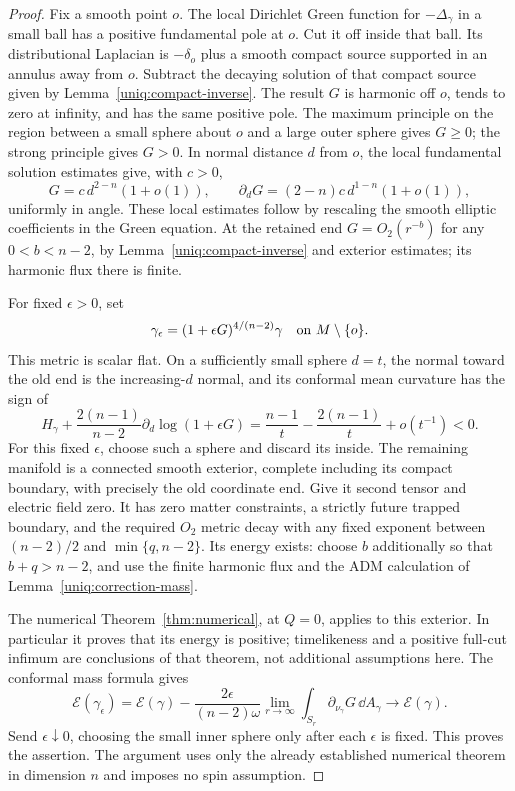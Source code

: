 \begin{proof}
Fix a smooth point $o$. The local Dirichlet Green function for
$-\Delta_\gamma$ in a small ball has a positive fundamental pole
at $o$. Cut it off inside that ball. Its distributional Laplacian
is $-\delta_o$ plus a smooth compact source supported in an annulus
away from $o$. Subtract the decaying solution of that compact
source given by Lemma~\ref{uniq:compact-inverse}. The result $G$
is harmonic off $o$, tends to zero at infinity, and has the same
positive pole. The maximum principle on the region between a
small sphere about $o$ and a large outer sphere gives $G\geq0$;
the strong principle gives $G>0$. In normal distance $d$ from $o$,
the local fundamental solution estimates give, with $c>0$,
\[
 G=c\,d^{2-n}(1+o(1)),\qquad
 \partial_dG=(2-n)c\,d^{1-n}(1+o(1)),
\]
uniformly in angle. These local estimates follow by rescaling the
smooth elliptic coefficients in the Green equation. At the retained
end $G=O_2(r^{-b})$ for any $0<b<n-2$, by
Lemma~\ref{uniq:compact-inverse} and exterior estimates; its
harmonic flux there is finite.

For fixed $\epsilon>0$, set
\[
 \gamma_\epsilon=(1+\epsilon G)^{4/(n-2)}\gamma
 \quad\hbox{on }M\setminus\{o\}.
\]
This metric is scalar flat. On a sufficiently small sphere $d=t$,
the normal toward the old end is the increasing-$d$ normal, and
its conformal mean curvature has the sign of
\[
 H_\gamma+\frac{2(n-1)}{n-2}
        \partial_d\log(1+\epsilon G)
 =\frac{n-1}{t}-\frac{2(n-1)}{t}+o(t^{-1})<0.
\]
For this fixed $\epsilon$, choose such a sphere and discard its
inside. The remaining manifold is a connected smooth exterior,
complete including its compact boundary, with precisely the old
coordinate end. Give it second tensor and electric field zero.
It has zero matter constraints, a strictly future trapped boundary,
and the required $O_2$ metric decay with any fixed exponent
between $(n-2)/2$ and $\min\{q,n-2\}$. Its energy exists:
choose $b$ additionally so that $b+q>n-2$, and use the finite
harmonic flux and the ADM calculation of
Lemma~\ref{uniq:correction-mass}.

The numerical Theorem~\ref{thm:numerical}, at $Q=0$, applies to
this exterior. In particular it proves that its energy is positive;
timelikeness and a positive full-cut infimum are conclusions of
that theorem, not additional assumptions here. The conformal mass
formula gives
\[
 \mathcal E(\gamma_\epsilon)
 =\mathcal E(\gamma)
   -\frac{2\epsilon}{(n-2)\omega}
       \lim_{r\to\infty}\int_{S_r}\partial_{\nu_\gamma}G
                              \,\dd A_\gamma
 \longrightarrow\mathcal E(\gamma).
\]
Send $\epsilon\downarrow0$, choosing the small inner sphere only
after each $\epsilon$ is fixed. This proves the assertion. The
argument uses only the already established numerical theorem in
dimension $n$ and imposes no spin assumption.
\end{proof}

